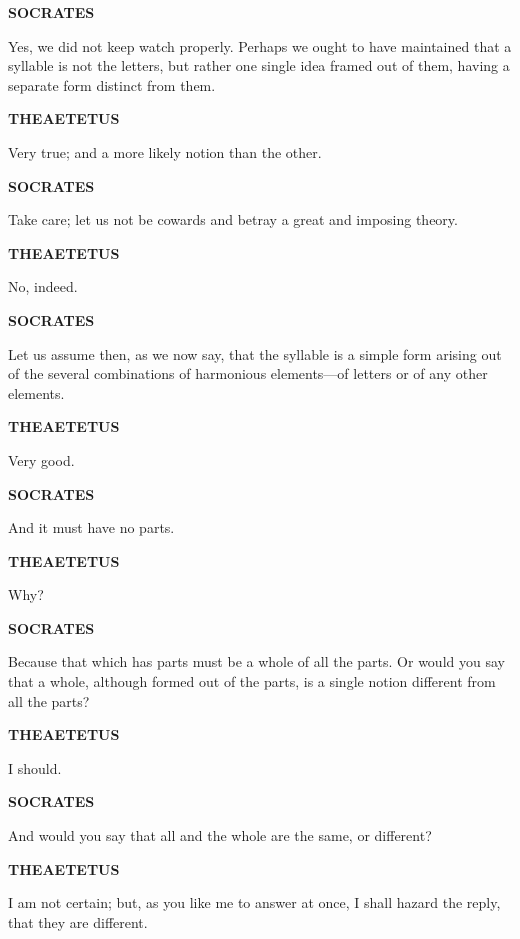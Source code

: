 \documentclass[11pt,letter]{article}
\begin{document}
\par \textbf{SOCRATES}
\par   Yes, we did not keep watch properly. Perhaps we ought to have maintained that a syllable is not the letters, but rather one single idea framed out of them, having a separate form distinct from them.

\par \textbf{THEAETETUS}
\par   Very true; and a more likely notion than the other.

\par \textbf{SOCRATES}
\par   Take care; let us not be cowards and betray a great and imposing theory.

\par \textbf{THEAETETUS}
\par   No, indeed.

\par \textbf{SOCRATES}
\par   Let us assume then, as we now say, that the syllable is a simple form arising out of the several combinations of harmonious elements—of letters or of any other elements.

\par \textbf{THEAETETUS}
\par   Very good.

\par \textbf{SOCRATES}
\par   And it must have no parts.

\par \textbf{THEAETETUS}
\par   Why?

\par \textbf{SOCRATES}
\par   Because that which has parts must be a whole of all the parts. Or would you say that a whole, although formed out of the parts, is a single notion different from all the parts?

\par \textbf{THEAETETUS}
\par   I should.

\par \textbf{SOCRATES}
\par   And would you say that all and the whole are the same, or different?

\par \textbf{THEAETETUS}
\par   I am not certain; but, as you like me to answer at once, I shall hazard the reply, that they are different.
\end{document}

